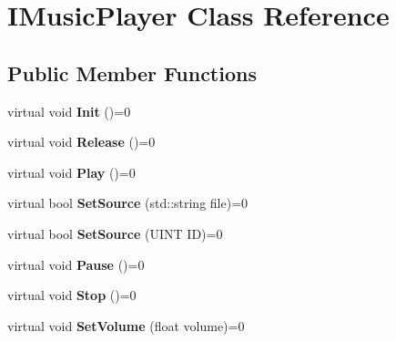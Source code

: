 \hypertarget{class_i_music_player}{}\section{I\+Music\+Player Class Reference}
\label{class_i_music_player}
\subsection*{Public Member Functions}
\begin{DoxyCompactItemize}
\item 
virtual void {\bfseries Init} ()=0\hypertarget{class_i_music_player_a695e6d7ff2dcb18519ef62802cfd20a8}{}\label{class_i_music_player_a695e6d7ff2dcb18519ef62802cfd20a8}

\item 
virtual void {\bfseries Release} ()=0\hypertarget{class_i_music_player_a83f80991f61467a1bb9e7638a91132b3}{}\label{class_i_music_player_a83f80991f61467a1bb9e7638a91132b3}

\item 
virtual void {\bfseries Play} ()=0\hypertarget{class_i_music_player_a2bb20e18b2124e3466bc483addafc8ad}{}\label{class_i_music_player_a2bb20e18b2124e3466bc483addafc8ad}

\item 
virtual bool {\bfseries Set\+Source} (std\+::string file)=0\hypertarget{class_i_music_player_a4fb663480af59b9583635d8889af3f6e}{}\label{class_i_music_player_a4fb663480af59b9583635d8889af3f6e}

\item 
virtual bool {\bfseries Set\+Source} (U\+I\+NT ID)=0\hypertarget{class_i_music_player_af0b438570293b67772c83bf2d86f13b5}{}\label{class_i_music_player_af0b438570293b67772c83bf2d86f13b5}

\item 
virtual void {\bfseries Pause} ()=0\hypertarget{class_i_music_player_a43ca2033b85046541315c3387f3c58eb}{}\label{class_i_music_player_a43ca2033b85046541315c3387f3c58eb}

\item 
virtual void {\bfseries Stop} ()=0\hypertarget{class_i_music_player_ac947647ce3097ca49257cd099852b964}{}\label{class_i_music_player_ac947647ce3097ca49257cd099852b964}

\item 
virtual void {\bfseries Set\+Volume} (float volume)=0\hypertarget{class_i_music_player_aed424daf271bb9d6675fc8c80357d964}{}\label{class_i_music_player_aed424daf271bb9d6675fc8c80357d964}


\end{DoxyCompactItemize}
